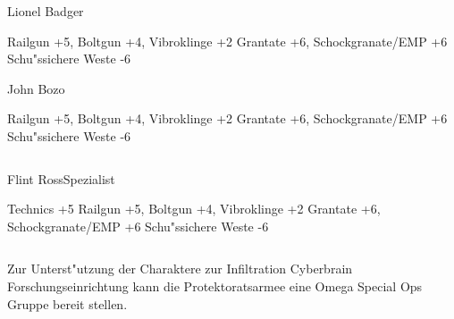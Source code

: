 \begin{column}[l]{0.45}
    \begin{nscsheet}[h]{Lionel Badger}
        \nscstats[ATT=5,AGG=3,EMP=3,KNO=4,HP=12]
        \nscruler
        \begin{nscinventory}
            \nscitem[Waffen] Railgun +5, Boltgun +4, Vibroklinge +2
            \nscitem[Granaten] Grantate +6, Schockgranate/EMP +6
            \nscitem[R"ustung] Schu"ssichere Weste -6           
        \end{nscinventory}
    \end{nscsheet}

    \begin{nscsheet}[h]{John Bozo}
        \nscstats[ATT=5,AGG=3,EMP=3,KNO=4,HP=12]
        \nscruler
        \begin{nscinventory}
            \nscitem[Waffen] Railgun +5, Boltgun +4, Vibroklinge +2
            \nscitem[Granaten] Grantate +6, Schockgranate/EMP +6
            \nscitem[R"ustung] Schu"ssichere Weste -6           
        \end{nscinventory}
    \end{nscsheet}
\end{column}
\begin{column}[r]{0.45}
    \begin{nscsheet}[h]{Flint Ross\newline{}Spezialist}
        \nscstats[ATT=2,AGG=2,EMP=3,KNO=5,HP=10]
        \nscruler
        \begin{nscinventory}
            \nscitem[F"ahigkeit] Technics +5
            \nscitem[Waffen] Railgun +5, Boltgun +4, Vibroklinge +2
            \nscitem[Granaten] Grantate +6, Schockgranate/EMP +6
            \nscitem[R"ustung] Schu"ssichere Weste -6
        \end{nscinventory}
    \end{nscsheet}
\end{column}


Zur Unterst"utzung der Charaktere zur Infiltration  Cyberbrain Forschungseinrichtung kann die Protektoratsarmee eine 
Omega Special Ops Gruppe bereit stellen.

